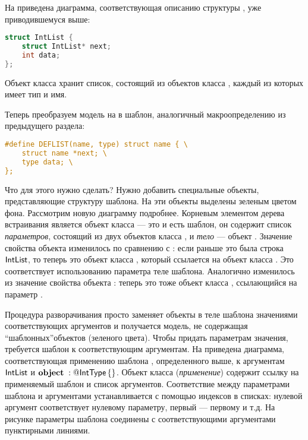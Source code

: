 На  приведена диаграмма, соответствующая описанию структуры , уже приводившемуся выше:
\begin{lstlisting}[language=C]
struct IntList {
	struct IntList* next;
	int data;
};
\end{lstlisting}
%
%
Объект класса  хранит список, состоящий из объектов класса 	, каждый из которых имеет тип и имя.

Теперь преобразуем модель на  в шаблон, аналогичный макроопределению  из предыдущего раздела:
\begin{lstlisting}[language=C]
#define DEFLIST(name, type) struct name { \
	struct name *next; \
	type data; \
};
\end{lstlisting}
Что для этого нужно сделать? Нужно добавить специальные объекты, представляющие структуру шаблона. На  эти объекты выделены зеленым цветом фона.
%
%
Рассмотрим новую диаграмму подробнее. Корневым элементом дерева встраивания является объект  класса  --- это и есть шаблон, он содержит список \emph{параметров}, состоящий из двух объектов класса , и \emph{тело} --- объект . Значение свойства  объекта  изменилось по сравнению с : если раньше это была строка $\mathsf{IntList}$, то теперь это объект класса , который ссылается на объект  класса . Это соответствует использованию параметра теле шаблона. Аналогично изменилось из значение свойства  объекта : теперь это тоже объект класса , ссылающийся на параметр .

Процедура разворачивания просто заменяет объекты  в теле шаблона значениями соответствующих аргументов и получается модель, не содержащая ``шаблонных''объектов (зеленого цвета). Чтобы придать параметрам значения, требуется  шаблон к соответствующим аргументам. 
%
%
На  приведена диаграмма, соответствующая применению шаблона , определенного выше, к аргументам $\mathsf{IntList}$ и $\mathbf{object}\; : @\mathsf{IntType}\left\{  \right\}$. Объект класса  (\emph{применение}) содержит ссылку на применяемый шаблон и список аргументов. Соответствие между параметрами шаблона и аргументами устанавливается с помощью индексов в списках: нулевой аргумент соответствует нулевому параметру, первый --- первому и т.д. На рисунке параметры шаблона соединены с соответствующими аргументами пунктирными линиями. 


